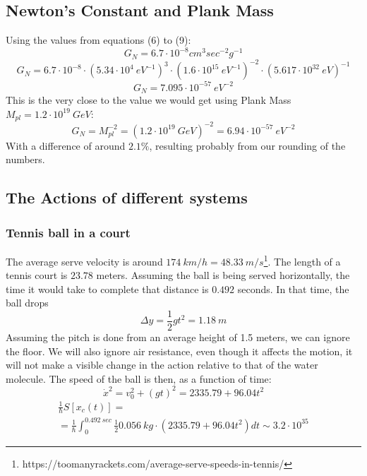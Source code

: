 \documentclass{article}
\begin{document}
\subsection{Newton's Constant and Plank Mass}
Using the values from equations (6) to (9):
\begin{equation}
    G_N = 6.7\cdot10^{-8} cm^3sec^{-2}g^{-1}
\end{equation}
\begin{equation}
    G_N = 6.7\cdot10^{-8}\cdot(5.34\cdot10^{4}\:eV^{-1})^{3}\cdot(1.6\cdot10^{15}\:eV^{-1})^{-2}\cdot(5.617\cdot10^{32}\:eV)^{-1}
\end{equation}
\begin{equation}
    G_N = 7.095\cdot10^{-57}\:eV^{-2}
\end{equation}
This is the very close to the value we would get using Plank Mass $M_{pl} = 1.2\cdot10^{19}\:GeV$:
\begin{equation}
    G_N = M_{pl}^{-2} = (1.2\cdot10^{19}\:GeV)^{-2} = 6.94\cdot10^{-57}\:eV^{-2}
\end{equation}
With a difference of around $2.1\%$, resulting probably from our rounding of the numbers.
\subsection{The Actions of different systems}
\subsubsection{Tennis ball in a court}
The average serve velocity is around $174 \ km/h = 48.33 \ m/s $\footnote{https://toomanyrackets.com/average-serve-speeds-in-tennis/}. The length of a tennis court is $23.78$ meters. Assuming the ball is being served horizontally, the time it would take to complete that distance is $0.492$ seconds. In that time, the ball drops
\begin{equation}
    \Delta y = \frac{1}{2}gt^2 = 1.18 \ m
\end{equation}
Assuming the pitch is done from an average height of 1.5 meters, we can ignore the floor. We will also ignore air resistance, even though it affects the motion, it will not make a visible change in the action relative to that of the water molecule. The speed of the ball is then, as a function of time:
\begin{equation}
    \dot{x}^2 = v_0^2 + (gt)^2 = 2335.79 + 96.04t^2
\end{equation}
\begin{equation}
\begin{gathered}
    \frac{1}{\hbar}S[x_c(t)] = \\
    = \frac{1}{\hbar} \int_{0}^{0.492 \ sec} \frac{1}{2} 0.056 \ kg \cdot \left( 2335.79 + 96.04t^2\right)dt \sim 3.2 \cdot 10^{35}
\end{gathered}
\end{equation}
\end{document}
